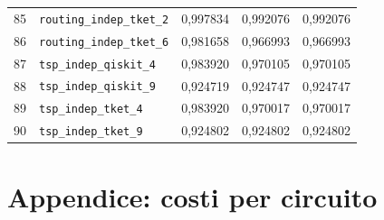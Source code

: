 \documentclass[a4paper,10pt]{article}
\begin{document}
\begin{longtable}{r p{8.2cm} r r r}
85 & \nolinkurl{routing_indep_tket_2} & 0,997834 & 0,992076 & 0,992076\\ 
86 & \nolinkurl{routing_indep_tket_6} & 0,981658 & 0,966993 & 0,966993\\ 
87 & \nolinkurl{tsp_indep_qiskit_4} & 0,983920 & 0,970105 & 0,970105\\ 
88 & \nolinkurl{tsp_indep_qiskit_9} & 0,924719 & 0,924747 & 0,924747\\ 
89 & \nolinkurl{tsp_indep_tket_4} & 0,983920 & 0,970017 & 0,970017\\ 
90 & \nolinkurl{tsp_indep_tket_9} & 0,924802 & 0,924802 & 0,924802\\ 
\bottomrule\end{longtable}\endgroup
\clearpage\section{Appendice: costi per circuito}
\end{document}
